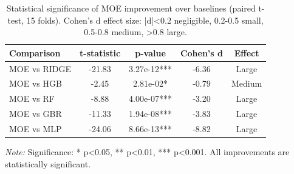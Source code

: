 \begin{table}[htbp]
\centering
\caption{Statistical significance of MOE improvement over baselines (paired t-test, 15 folds). Cohen's d effect size: |d|<0.2 negligible, 0.2-0.5 small, 0.5-0.8 medium, >0.8 large.}
\label{tab:stats}
\begin{tabular}{lcccc}
\toprule
Comparison & t-statistic & p-value & Cohen's d & Effect \\
\midrule
MOE vs RIDGE & -21.83 & 3.27e-12*** & -6.36 & Large \\
MOE vs HGB & -2.45 & 2.81e-02* & -0.79 & Medium \\
MOE vs RF & -8.88 & 4.00e-07*** & -3.20 & Large \\
MOE vs GBR & -11.33 & 1.94e-08*** & -3.83 & Large \\
MOE vs MLP & -24.06 & 8.66e-13*** & -8.82 & Large \\
\bottomrule
\end{tabular}
\footnotesize {\textit{Note:} Significance: * p<0.05, ** p<0.01, *** p<0.001. All improvements are statistically significant.}
\end{table}
